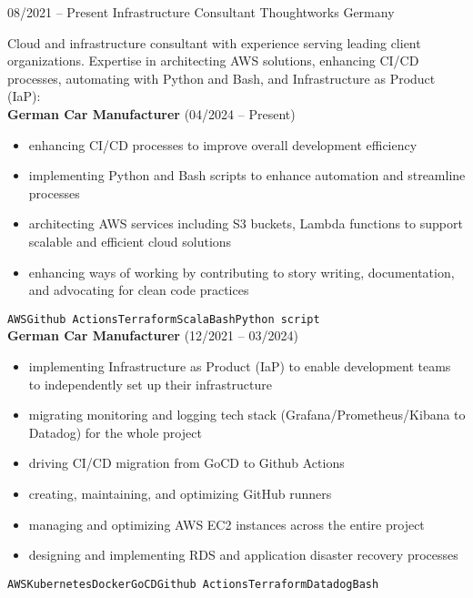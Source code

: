 \documentclass[9pt]{developercv} %
\begin{document}
    \begin{entrylist}
    	\entry
    		{08/2021 -- Present}
    		{Infrastructure Consultant}
    		{Thoughtworks Germany}
    		{Cloud and infrastructure consultant with experience serving leading client organizations. Expertise in architecting AWS solutions, enhancing CI/CD processes, automating with Python and Bash, and Infrastructure as Product (IaP):\\

            \textbf{German Car Manufacturer} {\footnotesize(04/2024 -- Present)}
            \begin{itemize}
                \item enhancing CI/CD processes to improve overall development efficiency
                \item implementing Python and Bash scripts to enhance automation and streamline processes
                \item architecting AWS services including S3 buckets, Lambda functions to support scalable and efficient cloud solutions
                \item enhancing ways of working by contributing to story writing, documentation, and advocating for clean code practices

            \end{itemize}
      \texttt{AWS}\slashsep\texttt{Github Actions}\slashsep\texttt{Terraform}\slashsep\texttt{Scala}\slashsep\texttt{Bash}\slashsep\texttt{Python script}\\

            \textbf{German Car Manufacturer} {\footnotesize(12/2021 -- 03/2024)}
            \begin{itemize}
                \item implementing Infrastructure as Product (IaP) to enable development teams to independently set up their infrastructure
                \item migrating monitoring and logging tech stack (Grafana/Prometheus/Kibana to Datadog) for the whole project
                \item driving CI/CD migration from GoCD to Github Actions
                \item creating, maintaining, and optimizing GitHub runners
                \item managing and optimizing AWS EC2 instances across the entire project
                \item designing and implementing RDS and application disaster recovery processes
            \end{itemize}
      \texttt{AWS}\slashsep\texttt{Kubernetes}\slashsep\texttt{Docker}\slashsep\texttt{GoCD}\slashsep\texttt{Github Actions}\slashsep\texttt{Terraform}\slashsep\texttt{Datadog}\slashsep\texttt{Bash}

}
\end{entrylist}
\end{document}
